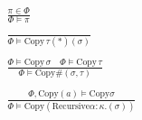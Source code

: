 \documentclass {article}
\begin{document}
\begin{gather*}
\\
\frac
{\pi \in \Phi}
{\Phi \models \pi} \\
\\
\frac
{}
{\Phi \models \text{Copy} \, \tau(*)(\sigma)} \\
\\
\frac
{\Phi \models \text {Copy} \, \sigma \quad \Phi \models \text{Copy} \, \tau}
{\Phi \models \text{Copy} \#(\sigma, \tau) } \\
\\
\frac
{\Phi, \text{Copy}(a)  \models \text{Copy} \sigma }
{\Phi \models \text{Copy} (\text{Recursive} \alpha : \kappa. (\sigma)) }
\end{gather*}
\end{document}
